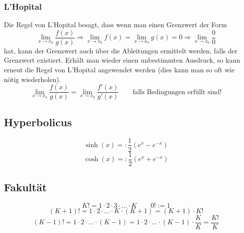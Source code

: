 \subsubsection{L'Hopital}
Die Regel von L'Hopital besagt, dass wenn man einen Grenzwert der Form 
\[ \lim\limits_{x \rightarrow x_0} \frac{f(x)}{g(x)} \Rightarrow \lim\limits_{x \rightarrow x_0} f(x) = \lim\limits_{x \rightarrow x_0} g(x) = 0 \Rightarrow \lim\limits_{x \rightarrow x_0} \frac{0}{0} \] hat, kann der Grenzwert auch über die Ableitungen ermittelt werden, falls der Grenzwert existiert.
Erhält man wieder einen unbestimmten Ausdruck, so kann erneut die Regel von L'Hopital angewendet werden (dies kann man so oft wie nötig wiederholen).
\[ \boxed{ \lim\limits_{x \rightarrow x_0} \frac{f(x)}{g(x)} = \lim\limits_{x \rightarrow x_0} \frac{f'(x)}{g'(x)} \quad} \quad \text{falls Bedingungen erfüllt sind!}\]

\subsection{Hyperbolicus}
\[ \boxed{\sinh(x) =: \frac{1}{2}\left(e^x - e^{-x} \right) }\]
\[ \boxed{\cosh(x) =: \frac{1}{2}\left(e^x + e^{-x} \right) }\]

\subsection{Fakultät}
\[ \boxed{K! = 1 \cdot 2 \cdot 3\cdot \ldots \cdot K} \qquad \boxed{0! := 1} \]
\[ \boxed{(K + 1)! = 1  \cdot 2 \cdot \ldots \cdot K \cdot (K + 1) = (K + 1) \cdot K!} \]
\[ \boxed{(K - 1)! = 1  \cdot 2 \cdot \ldots \cdot (K - 1) = 1  \cdot 2 \cdot \ldots \cdot (K - 1) \cdot \frac{K}{K} = \frac{K!}{K}} \]
